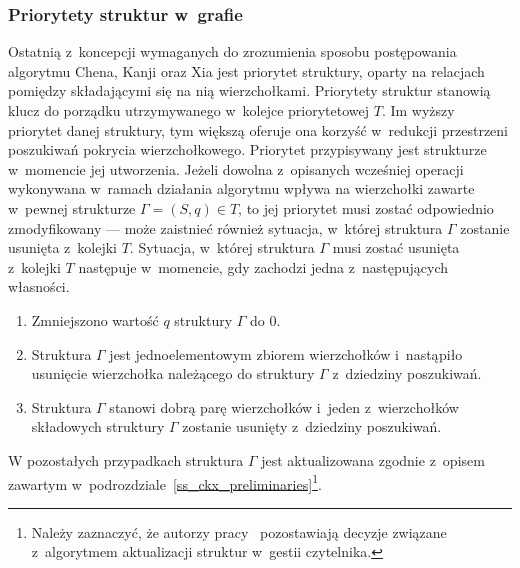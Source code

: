\subsubsection{\textbf{Priorytety struktur w~grafie}}
\label{sss_ckx_priorities}
\par{
  Ostatnią z~koncepcji wymaganych do zrozumienia sposobu postępowania algorytmu Chena, Kanji oraz Xia jest priorytet struktury, oparty na relacjach pomiędzy składającymi się na nią wierzchołkami.
  Priorytety struktur stanowią klucz do porządku utrzymywanego w~kolejce priorytetowej $T$.
  Im wyższy priorytet danej struktury, tym większą oferuje ona korzyść w~redukcji przestrzeni poszukiwań pokrycia wierzchołkowego.
  Priorytet przypisywany jest strukturze w~momencie jej utworzenia.
  Jeżeli dowolna z~opisanych wcześniej operacji wykonywana w~ramach działania algorytmu wpływa na wierzchołki zawarte w~pewnej strukturze $\Gamma=(S, q) \in T$, to jej priorytet musi zostać odpowiednio zmodyfikowany --- może zaistnieć również sytuacja, w~której struktura $\Gamma$ zostanie usunięta z~kolejki $T$.
  Sytuacja, w~której struktura $\Gamma$ musi zostać usunięta z~kolejki $T$ następuje w~momencie, gdy zachodzi jedna z~następujących własności.
  \begin{enumerate}
    \item Zmniejszono wartość $q$ struktury $\Gamma$ do $0$.
    \item Struktura $\Gamma$ jest jednoelementowym zbiorem wierzchołków i~nastąpiło usunięcie wierzchołka należącego do struktury $\Gamma$ z~dziedziny poszukiwań.
    \item Struktura $\Gamma$ stanowi dobrą parę wierzchołków i~jeden z~wierzchołków składowych struktury $\Gamma$ zostanie usunięty z~dziedziny poszukiwań.
  \end{enumerate}
  
  W pozostałych przypadkach struktura $\Gamma$ jest aktualizowana zgodnie z~opisem zawartym w~podrozdziale~\ref{ss_ckx_preliminaries}\footnote{Należy zaznaczyć, że autorzy pracy~\cite{ImprovedBounds10} pozostawiają decyzje związane z~algorytmem aktualizacji struktur w~gestii czytelnika.}.

}
